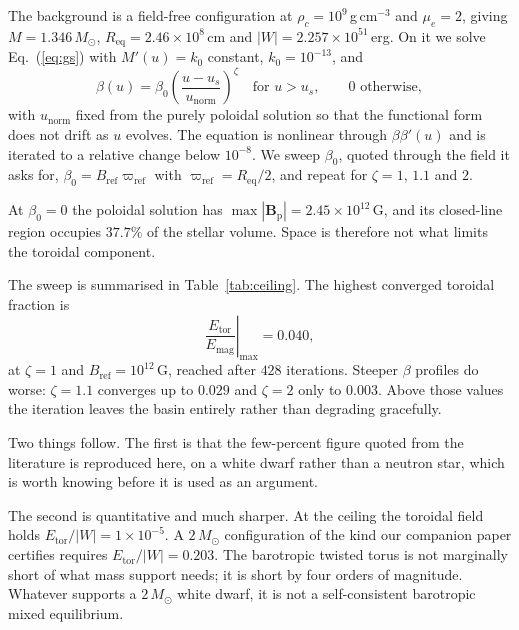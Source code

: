 \documentclass{aa}
\begin{document}
The background is a field-free configuration at
$\rho_c = 10^9$\,g\,cm$^{-3}$ and $\mu_e = 2$, giving
$M = 1.346\,M_\odot$, $R_{\mathrm{eq}} = 2.46\times10^8$\,cm and
$|W| = 2.257\times10^{51}$\,erg. On it we solve Eq.~(\ref{eq:gs}) with
$M'(u) = k_0$ constant, $k_0 = 10^{-13}$, and
\begin{equation}
\beta(u) = \beta_0
           \left(\frac{u-u_s}{u_{\mathrm{norm}}}\right)^{\zeta}
           \quad \text{for } u > u_s, \qquad 0 \text{ otherwise},
\label{eq:betaform}
\end{equation}
with $u_{\mathrm{norm}}$ fixed from the purely poloidal solution so that
the functional form does not drift as $u$ evolves. The equation is
nonlinear through $\beta\beta'(u)$ and is iterated to a relative change
below $10^{-8}$. We sweep $\beta_0$, quoted through the field it asks
for, $\beta_0 = B_{\mathrm{ref}}\varpi_{\mathrm{ref}}$ with
$\varpi_{\mathrm{ref}} = R_{\mathrm{eq}}/2$, and repeat for
$\zeta = 1$, $1.1$ and $2$.

At $\beta_0 = 0$ the poloidal solution has
$\max|\mathbf{B}_{\mathrm{p}}| = 2.45\times10^{12}$\,G, and its
closed-line region occupies $37.7\%$ of the stellar volume. Space is
therefore not what limits the toroidal component.

The sweep is summarised in Table~\ref{tab:ceiling}. The highest converged
toroidal fraction is
\begin{equation}
\left.\frac{E_{\mathrm{tor}}}{E_{\mathrm{mag}}}\right|_{\max}
  = 0.040,
\end{equation}
at $\zeta = 1$ and $B_{\mathrm{ref}} = 10^{12}$\,G, reached after $428$
iterations. Steeper $\beta$ profiles do worse: $\zeta = 1.1$ converges up
to $0.029$ and $\zeta = 2$ only to $0.003$. Above those values the
iteration leaves the basin entirely rather than degrading gracefully.

Two things follow. The first is that the few-percent figure quoted from
the literature is reproduced here, on a white dwarf rather than a neutron
star, which is worth knowing before it is used as an argument.

The second is quantitative and much sharper. At the ceiling the toroidal
field holds $E_{\mathrm{tor}}/|W| = 1\times10^{-5}$. A
$2\,M_\odot$ configuration of the kind our companion paper certifies
requires $E_{\mathrm{tor}}/|W| = 0.203$. The barotropic twisted torus is
not marginally short of what mass support needs; it is short by four
orders of magnitude. Whatever supports a $2\,M_\odot$ white dwarf, it is
not a self-consistent barotropic mixed equilibrium.
\end{document}
